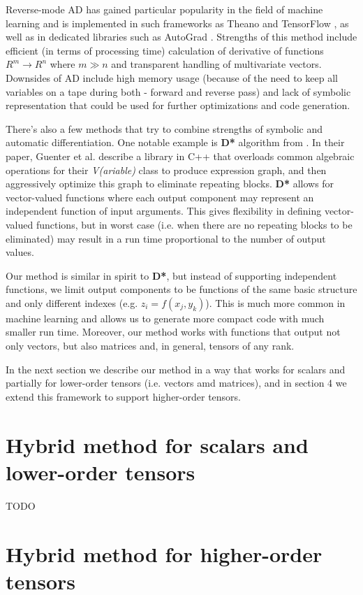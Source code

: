 \documentclass[conference]{IEEEtran}
\begin{document}
Reverse-mode AD has gained particular popularity in the field of machine learning and is implemented in such frameworks as Theano \cite{Theano} and TensorFlow \cite{TensorFlow}, as well as in dedicated libraries such as AutoGrad \cite{AutoGrad}. Strengths of this method include efficient (in terms of processing time) calculation of derivative of functions $R^m \to R^n$ where $m \gg n$ and transparent handling of multivariate vectors. Downsides of AD include high memory usage (because of the need to keep all variables on a tape during both - forward and reverse pass) and lack of symbolic representation that could be used for further optimizations and code generation. 

There's also a few methods that try to combine strengths of symbolic and automatic differentiation. One notable example is \textbf{D*} algorithm from \cite{guenter2007}. In their paper, Guenter et al. describe a library in C++ that overloads common algebraic operations for their \textit{V(ariable)} class to produce expression graph, and then aggressively optimize this graph to eliminate repeating blocks. \textbf{D*} allows for vector-valued functions where each output component may represent an independent function of input arguments. This gives flexibility in defining vector-valued functions, but in worst case (i.e. when there are no repeating blocks to be eliminated) may result in a run time proportional to the number of output values. 

Our method is similar in spirit to \textbf{D*}, but instead of supporting independent functions, we limit output components to be functions of the same basic structure and only different indexes (e.g. $z_i = f(x_j, y_k)$). This is much more common in machine learning and allows us to generate more compact code with much smaller run time. Moreover, our method works with functions that output not only vectors, but also matrices and, in general, tensors of any rank. 

In the next section we describe our method in a way that works for scalars and partially for lower-order tensors (i.e. vectors amd matrices), and in section 4 we extend this framework to support higher-order tensors.

\section{Hybrid method for scalars and lower-order tensors}

TODO

\section{Hybrid method for higher-order tensors}
\end{document}

